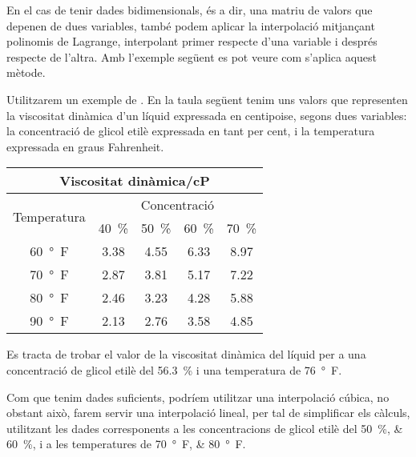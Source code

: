 En el cas de tenir dades bidimensionals, és a dir, una matriu de valors que depenen de dues variables, també podem aplicar la interpolació  mitjançant polinomis de Lagrange, interpolant primer respecte d'una variable i després respecte de l'altra. Amb l'exemple següent es pot veure com s'aplica aquest mètode.


\begin{exemple}
    Utilitzarem un exemple de \cite{EJB}. En la taula següent tenim uns valors que representen la viscositat dinàmica d'un líquid expressada en centipoise, segons dues variables: la concentració de glicol etilè
    expressada en tant per cent, i la temperatura expressada en graus Fahrenheit.

    \begin{center}
       \begin{tabular}{ccccc}
       \multicolumn{5}{c}{Viscositat dinàmica/cP}\\
       \toprule[1pt]
       \multirow{2}{25mm}{\rule{0mm}{4.5mm}Temperatura} & \multicolumn{4}{c}{Concentració}\\
       \cmidrule(rl){2-5}
                            & \qty{40}{\percent} & \qty{50}{\percent} & \qty{60}{\percent} & \qty{70}{\percent} \\
       \cmidrule(lr){1-5}
       \qty{60}{\degree F}  & \num{3,38}  & \num{4,55}  & \num{6,33}  & \num{8,97} \\
       \qty{70}{\degree F}  & \num{2,87}  & \num{3,81}  & \num{5,17}  & \num{7,22} \\
       \qty{80}{\degree F}  & \num{2,46}  & \num{3,23}  & \num{4,28}  & \num{5,88} \\
       \qty{90}{\degree F}  & \num{2,13}  & \num{2,76}  & \num{3,58}  & \num{4,85} \\
       \bottomrule[1pt]
       \end{tabular}
    \end{center}

    Es tracta de trobar el valor de la viscositat dinàmica del líquid per a una concentració de glicol etilè
    del \qty{56,3}{\percent} i una temperatura de \qty{76}{\degree F}.

    Com que tenim dades suficients, podríem utilitzar una interpolació cúbica, no obstant això, farem servir una interpolació lineal, per tal de simplificar els càlculs, utilitzant les dades corresponents  a les concentracions de glicol etilè del  \qtylist{50;60}{\percent}, i a les temperatures de  \qtylist{70;80}{\degree F}.


\end{exemple}
